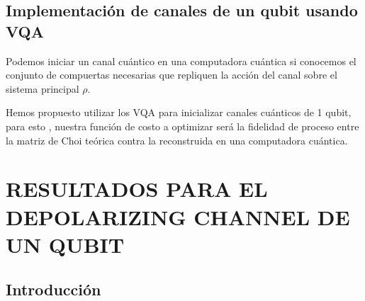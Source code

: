 \documentclass[letterpaper,12pt]{thesisECFM}
\theoremstyle{plain}
\theoremstyle{definition}
\theoremstyle{remark}
\newcommand{\1}{\mathbb{1}}
\begin{document}
\section{Implementación de canales de un qubit usando VQA}
Podemos iniciar un canal cuántico en una computadora cuántica si conocemos el conjunto de compuertas necesarias que repliquen la acción del canal sobre el sistema principal $\rho$. \par 

Hemos propuesto utilizar los VQA para inicializar canales cuánticos de 1 qubit, para esto , nuestra función de costo a optimizar será la fidelidad de proceso entre la matriz de Choi teórica contra la reconstruida en una computadora cuántica. \par 
 

\chapter{RESULTADOS PARA EL DEPOLARIZING CHANNEL DE UN QUBIT } %
\section{Introducción} %
\end{document}
